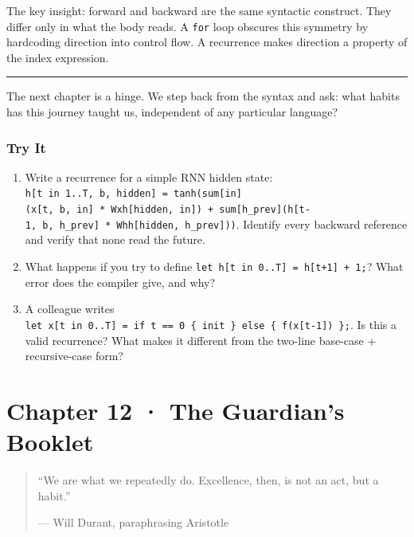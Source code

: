 \documentclass[11pt,]{article}
\begin{document}
The key insight: forward and backward are the same syntactic construct.
They differ only in what the body reads. A \texttt{for} loop obscures
this symmetry by hardcoding direction into control flow. A recurrence
makes direction a property of the index expression.

\begin{center}\rule{0.5\linewidth}{0.4pt}\end{center}

The next chapter is a hinge. We step back from the syntax and ask: what
habits has this journey taught us, independent of any particular
language?

\hypertarget{try-it-10}{%
\subsubsection{Try It}\label{try-it-10}}

\begin{enumerate}
\def\labelenumi{\arabic{enumi}.}
\item
  Write a recurrence for a simple RNN hidden state:
  \texttt{h{[}t\ in\ 1..T,\ b,\ hidden{]}\ =\ tanh(sum{[}in{]}(x{[}t,\ b,\ in{]}\ *\ Wxh{[}hidden,\ in{]})\ +\ sum{[}h\_prev{]}(h{[}t-1,\ b,\ h\_prev{]}\ *\ Whh{[}hidden,\ h\_prev{]}))}.
  Identify every backward reference and verify that none read the
  future.
\item
  What happens if you try to define
  \texttt{let\ h{[}t\ in\ 0..T{]}\ =\ h{[}t+1{]}\ +\ 1;}? What error
  does the compiler give, and why?
\item
  A colleague writes
  \texttt{let\ x{[}t\ in\ 0..T{]}\ =\ if\ t\ ==\ 0\ \{\ init\ \}\ else\ \{\ f(x{[}t-1{]})\ \};}.
  Is this a valid recurrence? What makes it different from the two-line
  base-case + recursive-case form?
\end{enumerate}

\newpage

\hypertarget{chapter-12-the-guardians-booklet}{%
\section{Chapter 12 · The Guardian's
Booklet}\label{chapter-12-the-guardians-booklet}}

\begin{quote}
``We are what we repeatedly do. Excellence, then, is not an act, but a
habit.''

--- Will Durant, paraphrasing Aristotle
\end{quote}
\end{document}
